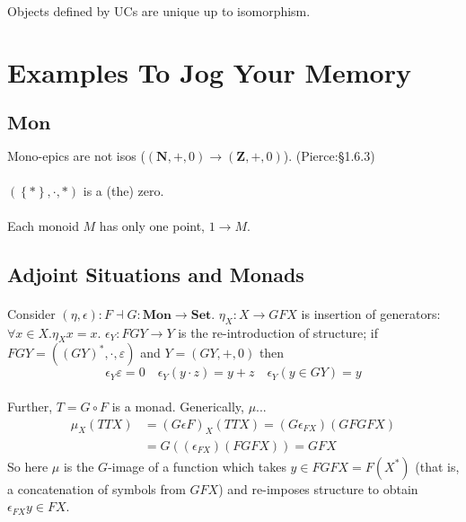 \documentclass[10pt,twocolumn,letterpaper]{article}
\newcommand{\set}[1]{\left\{{#1}\right\}}
\begin{document}
  \paragraph{}
  Objects defined by UCs are unique up to isomorphism.

\section{Examples To Jog Your Memory}

\subsection{$\mathbf{Mon}$}

  \paragraph{}
  Mono-epics are not isos ($(\mathbf{N},+,0) \to (\mathbf{Z},+,0)$).
  (Pierce:\S1.6.3)

  \paragraph{}
  $(\set{*},\cdot,*)$ is a (the) zero.

  \paragraph{}
  Each monoid $M$ has only one point, $1 \to M$.

\subsection{Adjoint Situations and Monads}

  \paragraph{}
  Consider $(\eta, \epsilon) : F \dashv G : \mathbf{Mon} \to \mathbf{Set}$.
  $\eta_X : X \to GFX$ is insertion of generators: $\forall x \in X . \eta_X x = x$.
  $\epsilon_Y : FGY \to Y$ is the re-introduction of structure;
  if $FGY = ((GY)^*, \cdot, \varepsilon)$ and $Y = (GY, +, 0)$ then
    \[ \epsilon_Y \varepsilon = 0
      \quad \epsilon_Y (y \cdot z) =  y + z
      \quad \epsilon_Y (y \in GY)  =  y
    \]

  \paragraph{}
  Further, $T = G \circ F$ is a monad.  Generically, $\mu$...
  \begin{align*}
    \mu_X (TTX) &= (G \epsilon F)_X (TTX) = (G \epsilon_{FX}) (GFGFX) \\
       &= G ((\epsilon_{FX})(FGFX)) = GFX
  \end{align*}
  So here $\mu$ is the $G$-image of a function which takes $y \in FGFX =
  F(X^*)$ (that is, a concatenation of symbols from $GFX$) and re-imposes
  structure to obtain $\epsilon_{FX} y \in FX$.
\end{document}
